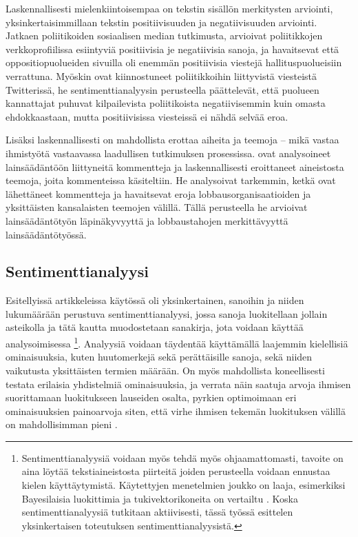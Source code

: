 \documentclass[finnish,gradu,twoside,12pt]{tktltiki}
\begin{document}
{Laskennallisesti mielenkiintoisempaa on tekstin sisällön merkitysten arviointi, yksinkertaisimmillaan tekstin positiivisuuden ja negatiivisuuden arviointi. Jatkaen poliitikoiden sosiaalisen median tutkimusta, \citet{park2011networked} arvioivat poliitikkojen verkkoprofiilissa esiintyviä positiivisia je negatiivisia sanoja, ja havaitsevat että oppositiopuolueiden sivuilla oli enemmän positiivisia viestejä hallituspuolueisiin verrattuna. Myöskin \citet{tumasjan2010election} ovat kiinnostuneet poliitikkoihin liittyvistä viesteistä Twitterissä, he sentimenttianalyysin perusteella päättelevät, että puolueen kannattajat puhuvat kilpailevista poliitikoista negatiivisemmin kuin omasta ehdokkaastaan, mutta positiivisissa viesteissä ei nähdä selvää eroa.

Lisäksi laskennallisesti on mahdollista erottaa aiheita ja teemoja -- mikä vastaa ihmistyötä vastaavassa laadullisen tutkimuksen prosessissa. \citet{levy2013driving} ovat analysoineet lainsäädäntöön liittyneitä kommentteja ja laskennallisesti eroittaneet aineistosta teemoja, joita kommenteissa käsiteltiin. He analysoivat tarkemmin, ketkä ovat lähettäneet kommentteja ja havaitsevat eroja lobbausorganisaatioiden ja yksittäisten kansalaisten teemojen välillä. Tällä perusteella he arvioivat lainsäädäntötyön läpinäkyvyyttä ja lobbaustahojen merkittävyyttä lainsäädäntötyössä.

\subsection{Sentimenttianalyysi}

Esitellyissä artikkeleissa käytössä oli yksinkertainen, sanoihin ja niiden lukumäärään perustuva sentimenttianalyysi, jossa sanoja luokitellaan jollain asteikolla ja tätä kautta muodostetaan sanakirja, jota voidaan käyttää analysoimisessa \citep{pennebaker2001linguistic,Thelwall2010}\footnote{Sentimenttianalyysiä voidaan myös tehdä myös ohjaamattomasti, tavoite on aina löytää tekstiaineistosta piirteitä joiden perusteella voidaan ennustaa kielen käyttäytymistä. Käytettyjen menetelmien joukko on laaja, esimerkiksi Bayesilaisia luokittimia ja tukivektorikoneita on vertailtu \citep{Pang02a,Pang05a,Thelwall2010}. Koska sentimenttianalyysiä tutkitaan aktiivisesti, tässä työssä esittelen yksinkertaisen toteutuksen sentimenttianalyysistä.}. Analyysiä voidaan täydentää käyttämällä laajemmin kielellisiä ominaisuuksia, kuten huutomerkejä sekä perättäisille sanoja, sekä niiden vaikutusta yksittäisten termien määrään. On myös mahdollista koneellisesti testata erilaisia yhdistelmiä ominaisuuksia, ja verrata näin saatuja arvoja ihmisen suorittamaan luokitukseen lauseiden osalta, pyrkien optimoimaan eri ominaisuuksien painoarvoja siten, että virhe ihmisen tekemän luokituksen välillä on mahdollisimman pieni \citep{Thelwall2010}.

}
\end{document}

